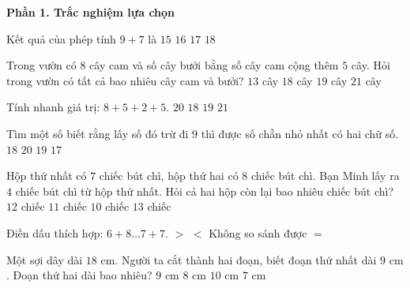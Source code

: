 \textbf{Phần 1. Trắc nghiệm lựa chọn}

\begin{ex} %
Kết quả của phép tính $9 + 7$ là
\choice
{$15$}
{\True $16$}
{$17$}
{$18$}
\end{ex}

\begin{ex} %
Trong vườn có $8$ cây cam và số cây bưởi bằng số cây cam cộng thêm $5$ cây. Hỏi trong vườn có tất cả bao nhiêu cây cam và bưởi?
\choice
{$13$ cây}
{$18$ cây}
{$19$ cây}
{\True $21$ cây}
\end{ex}

\begin{ex} %
Tính nhanh giá trị: $8 + 5 + 2 + 5$.
\choice
{\True $20$}
{$18$}
{$19$}
{$21$}
\end{ex}

\begin{ex} %
Tìm một số biết rằng lấy số đó trừ đi $9$ thì được số chẵn nhỏ nhất có hai chữ số.
\choice
{$18$}
{$20$}
{\True $19$}
{$17$}
\end{ex}

\begin{ex} %
Hộp thứ nhất có $7$ chiếc bút chì, hộp thứ hai có $8$ chiếc bút chì. Bạn Minh lấy ra $4$ chiếc bút chì từ hộp thứ nhất. Hỏi cả hai hộp còn lại bao nhiêu chiếc bút chì?
\choice
{$12$ chiếc}
{\True $11$ chiếc}
{$10$ chiếc}
{$13$ chiếc}
\end{ex}

\begin{ex} %
Điền dấu thích hợp: $6 + 8 \dots 7 + 7$.
\choice
{$>$}
{$<$}
{Không so sánh được}
{\True $=$}
\end{ex}

\begin{ex} %
Một sợi dây dài $18\text{ cm}$. Người ta cắt thành hai đoạn, biết đoạn thứ nhất dài $9\text{ cm}$. Đoạn thứ hai dài bao nhiêu?
\choice
{\True $9\text{ cm}$}
{$8\text{ cm}$}
{$10\text{ cm}$}
{$7\text{ cm}$}
\end{ex}

